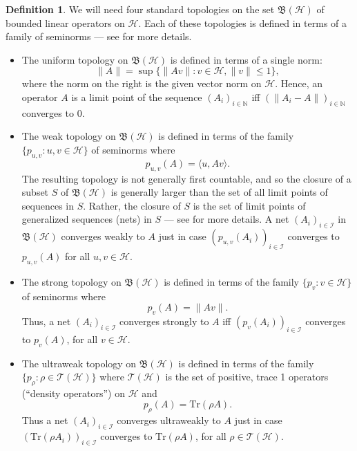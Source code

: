 \documentclass[12pt]{article}
\newcommand{\norm}[1]{\| #1\|}
\newcommand{\bh}{\mathfrak{B}(\mathcal{H})}
\theoremstyle{definition}
\theoremstyle{definition}
\newtheorem{defn}[thm]{Definition}
\theoremstyle{remark}
\def\2#1{{\mathcal #1}}
\def\7#1{{\mathbb #1}}
\begin{document}
\begin{defn} We will need four standard topologies on the set $\bh$ of bounded linear
  operators on $\2H$.  Each of these topologies is defined in terms of a family of
  seminorms --- see \cite[Chaps.\ 1,5]{kr} for more details.
\begin{itemize}
\item The uniform topology on $\bh$ is defined in terms of a single norm:
$$ \norm{A} =\sup \{ \norm{Av}:v\in \2H ,\norm{v}\leq 1 \} ,$$
where the norm on the right is the given vector norm on $\2H$.  Hence, an operator
$A$ is a limit point of the sequence $(A_i)_{i\in \7N}$ iff $(\norm{A_i-A})_{i\in
  \7N}$ converges to $0$.
\item The weak topology on $\bh$ is defined in terms of the family $\{ p_{u,v}:u,v\in
  \2H \}$ of seminorms where
$$ p_{u,v}(A)=\langle u,Av\rangle .$$
The resulting topology is not generally first countable, and so the closure of a
subset $S$ of $\bh$ is generally larger than the set of all limit points of sequences
in $S$.  Rather, the closure of $S$ is the set of limit points of generalized
sequences (nets) in $S$ --- see \cite[Chap.\ 1]{kr} for more details.  A net
$(A_i)_{i\in \2I}$ in $\bh$ converges weakly to $A$ just in case
$(p_{u,v}(A_i))_{i\in \2I}$ converges to $p_{u,v}(A)$ for all $u,v\in \2H$.
\item The strong topology on $\bh$ is defined in terms of the family $\{ p_v :v\in
  \2H \}$ of seminorms where
$$ p_v(A) =\norm{Av} .$$
Thus, a net $(A_i)_{i\in \2I}$ converges strongly to $A$ iff $(p_v(A_i))_{i\in \2I}$
converges to $p_v(A)$, for all $v\in \2H$.
\item The ultraweak topology on $\bh$ is defined in terms of the family $\{ p_{\rho}
  :\rho \in \2T (\2H ) \}$ where $\2T (\2H )$ is the set of positive, trace 1
  operators (``density operators'') on $\2H$ and 
$$ p_\rho (A)=\mathrm{Tr} (\rho A) .$$
Thus a net $(A_i)_{i\in \2I}$ converges ultraweakly to $A$ just in case
$(\mathrm{Tr}(\rho A_i))_{i\in \2I}$ converges to $\mathrm{Tr}(\rho A)$, for all
$\rho \in \2T (\2H )$.
\end{itemize}
\end{defn}
\end{document}
